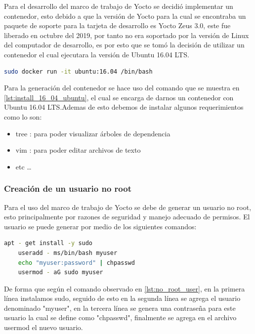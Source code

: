 Para el desarrollo del marco de trabajo de Yocto se decidió implementar un contenedor, esto debido a que la versión de Yocto para la cual se encontraba un paquete de soporte para la tarjeta de desarrollo es Yocto Zeus 3.0, este fue liberado en octubre del 2019, por tanto no era soportado por la versión de Linux del computador de desarrollo, es por esto que se tomó la decisión de utilizar un contenedor el cual ejecutara la versión de Ubuntu 16.04 LTS. 

\begin{lstlisting}[language=bash, caption={Instalacion de Ubuntu 16.04}, label=lst:install_16_04_ubuntu]
    sudo docker run -it ubuntu:16.04 /bin/bash
\end{lstlisting}

Para la generación del contenedor se hace uso del comando que se muestra en \ref{lst:install_16_04_ubuntu}, el cual se encarga de darnos un contenedor con Ubuntu 16.04 LTS.Ademas de esto debemos de instalar algunos requerimientos como lo son:

\begin{itemize}
    \item tree : para poder visualizar árboles de dependencia
    \item vim : para poder editar archivos de texto
    \item etc \dots
\end{itemize}

\subsubsection{Creación de un usuario no root}

Para el uso del marco de trabajo de Yocto se debe de generar un usuario no root, esto principalmente por razones de seguridad y manejo adecuado de permisos. El usuario se puede generar por medio de los siguientes comandos:

\begin{lstlisting}[language=bash, caption={Generacion de usuario no root, Linux}, label=lst:no_root_user]
    apt - get install -y sudo
    useradd - ms/bin/bash myuser
    echo "myuser:password" | chpasswd
    usermod - aG sudo myuser
\end{lstlisting}

De forma que según el comando observado en \ref{lst:no_root_user}, en la primera línea instalamos sudo, seguido de esto en la segunda línea se agrega el usuario denominado "myuser", en la tercera línea se genera una contraseña para este usuario la cual se define como "chpasswd", finalmente se agrega en el archivo usermod el nuevo usuario. 

